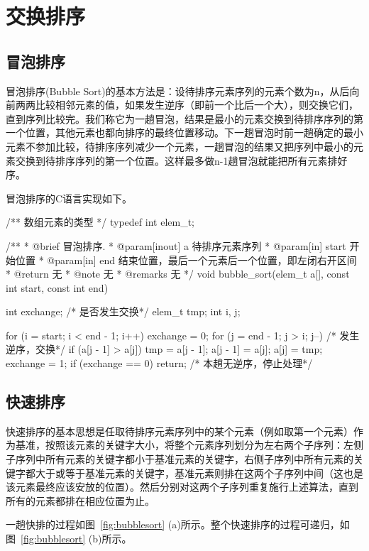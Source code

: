 \section{交换排序} %


\subsection{冒泡排序}
冒泡排序(Bubble Sort)的基本方法是：设待排序元素序列的元素个数为n，从后向前两两比较相邻元素的值，如果发生逆序（即前一个比后一个大），则交换它们，直到序列比较完。我们称它为一趟冒泡，结果是最小的元素交换到待排序序列的第一个位置，其他元素也都向排序的最终位置移动。下一趟冒泡时前一趟确定的最小元素不参加比较，待排序序列减少一个元素，一趟冒泡的结果又把序列中最小的元素交换到待排序序列的第一个位置。这样最多做n-1趟冒泡就能把所有元素排好序。

冒泡排序的C语言实现如下。
\begin{Codex}[label=bubble_sort.c]
/** 数组元素的类型 */
typedef int elem_t;

/**
  * @brief 冒泡排序.
  * @param[inout] a 待排序元素序列
  * @param[in] start 开始位置
  * @param[in] end 结束位置，最后一个元素后一个位置，即左闭右开区间
  * @return 无
  * @note 无
  * @remarks 无
  */
void bubble_sort(elem_t a[], const int start, const int end) {
    int exchange; /* 是否发生交换*/
    elem_t tmp;
    int i, j;

    for (i = start; i < end - 1; i++) {
        exchange = 0;
        for (j = end - 1; j > i; j--) { /* 发生逆序，交换*/
            if (a[j - 1] > a[j]) {
                tmp = a[j - 1];
                a[j - 1] = a[j];
                a[j] = tmp;
                exchange = 1;
            }
        }
        if (exchange == 0) return; /* 本趟无逆序，停止处理*/
    }
}
\end{Codex}

\subsection{快速排序}
快速排序的基本思想是任取待排序元素序列中的某个元素（例如取第一个元素）作为基准，按照该元素的关键字大小，将整个元素序列划分为左右两个子序列：左侧子序列中所有元素的关键字都小于基准元素的关键字，右侧子序列中所有元素的关键字都大于或等于基准元素的关键字，基准元素则排在这两个子序列中间（这也是该元素最终应该安放的位置）。然后分别对这两个子序列重复施行上述算法，直到所有的元素都排在相应位置为止。

一趟快排的过程如图~\ref{fig:bubblesort} (a)所示。整个快速排序的过程可递归，如图~\ref{fig:bubblesort} (b)所示。

